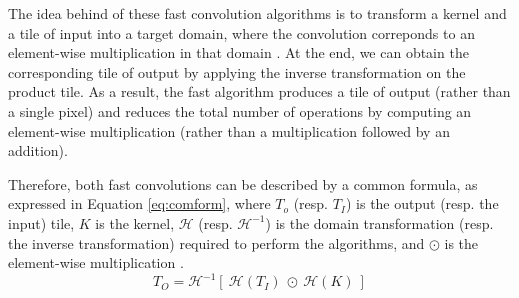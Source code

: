 The idea behind of these fast convolution algorithms is to transform a kernel and a tile of input into a target domain, where the convolution correponds to an element-wise multiplication in that domain \cite{abdelouahab_accelerating_2018}. At the end, we can obtain the corresponding tile of output by applying the inverse transformation on the product tile. As a result, the fast algorithm produces a tile of output (rather than a single pixel) and reduces the total number of operations by computing an element-wise multiplication (rather than a multiplication followed by an addition).

Therefore, both fast convolutions can be described by a common formula, as expressed in Equation \eqref{eq:comform}, where $T_o$ (resp. $T_I$) is the output (resp. the input) tile, $K$ is the kernel, $\mathcal{H}$ (resp. $\mathcal{H}^{-1}$) is the domain transformation (resp. the inverse transformation) required to perform the algorithms, and $\odot$ is the element-wise multiplication \cite{liang_evaluating_2020}.
%
\begin{equation}
    T_O = \mathcal{H}^{-1} [ \ \mathcal{H}(T_I) \ \odot \ \mathcal{H}(K) \ ]
    \label{eq:comform}
\end{equation}
%
